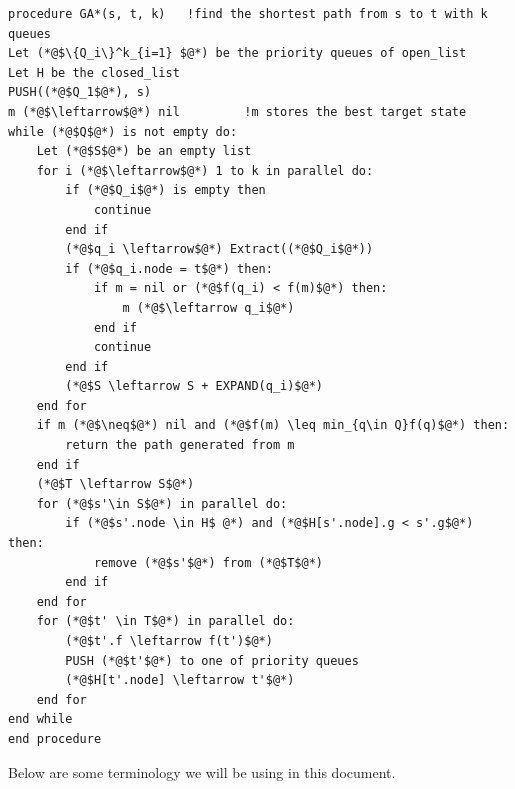 \documentclass[a4paper]{article}
\begin{document}
\begin{lstlisting}[language=FORTRAN, caption=GA*~\cite{GA*},label={algo:ga_star}]
procedure GA*(s, t, k)   !find the shortest path from s to t with k queues
Let (*@$\{Q_i\}^k_{i=1} $@*) be the priority queues of open_list
Let H be the closed_list
PUSH((*@$Q_1$@*), s)
m (*@$\leftarrow$@*) nil         !m stores the best target state
while (*@$Q$@*) is not empty do:
    Let (*@$S$@*) be an empty list
    for i (*@$\leftarrow$@*) 1 to k in parallel do:
        if (*@$Q_i$@*) is empty then
            continue
        end if
        (*@$q_i \leftarrow$@*) Extract((*@$Q_i$@*))
        if (*@$q_i.node = t$@*) then:
            if m = nil or (*@$f(q_i) < f(m)$@*) then:
                m (*@$\leftarrow q_i$@*)
            end if
            continue
        end if
        (*@$S \leftarrow S + EXPAND(q_i)$@*)
    end for
    if m (*@$\neq$@*) nil and (*@$f(m) \leq min_{q\in Q}f(q)$@*) then:
        return the path generated from m
    end if
    (*@$T \leftarrow S$@*)
    for (*@$s'\in S$@*) in parallel do:
        if (*@$s'.node \in H$ @*) and (*@$H[s'.node].g < s'.g$@*) then:
            remove (*@$s'$@*) from (*@$T$@*)
        end if
    end for
    for (*@$t' \in T$@*) in parallel do:
        (*@$t'.f \leftarrow f(t')$@*)
        PUSH (*@$t'$@*) to one of priority queues
        (*@$H[t'.node] \leftarrow t'$@*)
    end for
end while
end procedure

\end{lstlisting}
Below are some terminology we will be using in this document.
\end{document}
